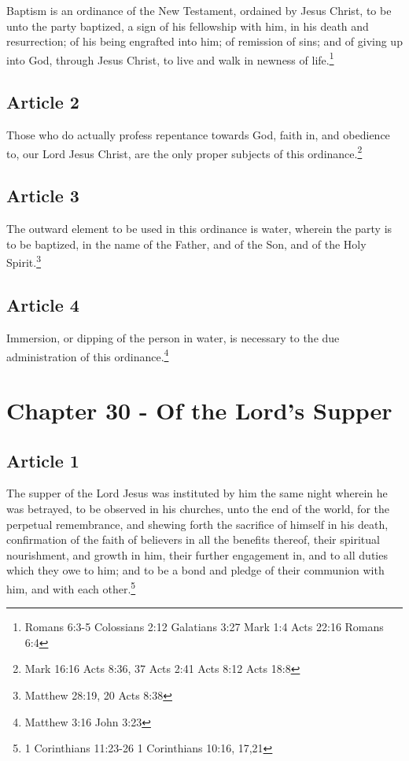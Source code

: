 \documentclass[12pt,letterpaper]{book}
\begin{document}
Baptism is an ordinance of the New Testament, ordained by Jesus Christ, to be unto the party baptized, a sign of his fellowship with him, in his death and resurrection; of his being engrafted into him; of remission of sins; and of giving up into God, through Jesus Christ, to live and walk in newness of life.\footnote{Romans 6:3-5 Colossians 2:12 Galatians 3:27 Mark 1:4 Acts 22:16 Romans 6:4}

\section{Article 2}

Those who do actually profess repentance towards God, faith in, and obedience to, our Lord Jesus Christ, are the only proper subjects of this ordinance.\footnote{Mark 16:16 Acts 8:36, 37 Acts 2:41 Acts 8:12 Acts 18:8}

\section{Article 3}

The outward element to be used in this ordinance is water, wherein the party is to be baptized, in the name of the Father, and of the Son, and of the Holy Spirit.\footnote{Matthew 28:19, 20 Acts 8:38}

\section{Article 4}

Immersion, or dipping of the person in water, is necessary to the due administration of this ordinance.\footnote{Matthew 3:16 John 3:23}

\chapter{Chapter 30 - Of the Lord's Supper}
\section{Article 1}

The supper of the Lord Jesus was instituted by him the same night wherein he was betrayed, to be observed in his churches, unto the end of the world, for the perpetual remembrance, and shewing forth the sacrifice of himself in his death, confirmation of the faith of believers in all the benefits thereof, their spiritual nourishment, and growth in him, their further engagement in, and to all duties which they owe to him; and to be a bond and pledge of their communion with him, and with each other.\footnote{1 Corinthians 11:23-26 1 Corinthians 10:16, 17,21}
\end{document}
